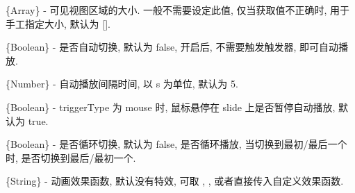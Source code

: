 \documentclass[letterpaper,10pt,english]{sphinxmanual}
\begin{document}

\begin{fulllineitems}
\label{api/component/switchable/switchable:Switchable.viewSize}
\{Array\} - 可见视图区域的大小. 一般不需要设定此值, 仅当获取值不正确时, 用于手工指定大小, 默认为 {[}{]}.

\end{fulllineitems}



\begin{fulllineitems}
\label{api/component/switchable/switchable:Switchable.autoplay}
\{Boolean\} - 是否自动切换, 默认为 false, 开启后, 不需要触发触发器, 即可自动播放.

\end{fulllineitems}



\begin{fulllineitems}
\label{api/component/switchable/switchable:Switchable.interval}
\{Number\} - 自动播放间隔时间, 以 s 为单位, 默认为 5.

\end{fulllineitems}



\begin{fulllineitems}
\label{api/component/switchable/switchable:Switchable.pauseOnHover}
\{Boolean\} - triggerType 为 mouse 时, 鼠标悬停在 slide 上是否暂停自动播放, 默认为 true.

\end{fulllineitems}



\begin{fulllineitems}
\label{api/component/switchable/switchable:Switchable.circular}
\{Boolean\} - 是否循环切换, 默认为 false, 是否循环播放, 当切换到最初/最后一个时, 是否切换到最后/最初一个.

\end{fulllineitems}



\begin{fulllineitems}
\label{api/component/switchable/switchable:Switchable.effect}
\{String\} - 动画效果函数, 默认没有特效, 可取 , ,  或者直接传入自定义效果函数.

\end{fulllineitems}
\end{document}

